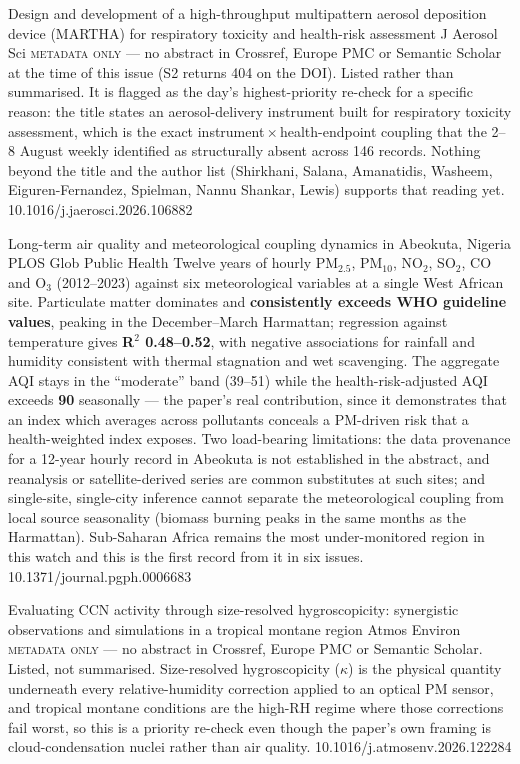 \documentclass[10pt]{article}
\begin{document}
{Design and development of a high-throughput multipattern aerosol deposition device (MARTHA) for respiratory toxicity and health-risk assessment}
{J Aerosol Sci}
{\textsc{metadata only} --- no abstract in Crossref, Europe PMC or Semantic Scholar at the
time of this issue (S2 returns 404 on the DOI). Listed rather than summarised. It is
flagged as the day's highest-priority re-check for a specific reason: the title states an
aerosol-delivery instrument built for respiratory toxicity assessment, which is the exact
instrument\,$\times$\,health-endpoint coupling that the 2--8 August weekly identified as
structurally absent across 146 records. Nothing beyond the title and the author list
(Shirkhani, Salana, Amanatidis, Washeem, Eiguren-Fernandez, Spielman, Nannu Shankar,
Lewis) supports that reading yet.}
{10.1016/j.jaerosci.2026.106882}


{Long-term air quality and meteorological coupling dynamics in Abeokuta, Nigeria}
{PLOS Glob Public Health}
{Twelve years of hourly PM$_{2.5}$, PM$_{10}$, NO$_2$, SO$_2$, CO and O$_3$ (2012--2023)
against six meteorological variables at a single West African site. Particulate matter
dominates and \textbf{consistently exceeds WHO guideline values}, peaking in the
December--March Harmattan; regression against temperature gives \textbf{R$^2$
0.48--0.52}, with negative associations for rainfall and humidity consistent with thermal
stagnation and wet scavenging. The aggregate AQI stays in the ``moderate'' band (39--51)
while the health-risk-adjusted AQI exceeds \textbf{90} seasonally --- the paper's real
contribution, since it demonstrates that an index which averages across pollutants
conceals a PM-driven risk that a health-weighted index exposes. Two load-bearing
limitations: the data provenance for a 12-year hourly record in Abeokuta is not
established in the abstract, and reanalysis or satellite-derived series are common
substitutes at such sites; and single-site, single-city inference cannot separate the
meteorological coupling from local source seasonality (biomass burning peaks in the same
months as the Harmattan). Sub-Saharan Africa remains the most under-monitored region in
this watch and this is the first record from it in six issues.}
{10.1371/journal.pgph.0006683}

{Evaluating CCN activity through size-resolved hygroscopicity: synergistic observations and simulations in a tropical montane region}
{Atmos Environ}
{\textsc{metadata only} --- no abstract in Crossref, Europe PMC or Semantic Scholar.
Listed, not summarised. Size-resolved hygroscopicity ($\kappa$) is the physical quantity
underneath every relative-humidity correction applied to an optical PM sensor, and
tropical montane conditions are the high-RH regime where those corrections fail worst, so
this is a priority re-check even though the paper's own framing is cloud-condensation
nuclei rather than air quality.}
{10.1016/j.atmosenv.2026.122284}
\end{document}
